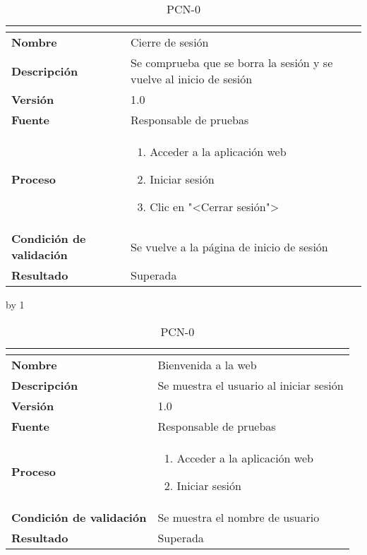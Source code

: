 \begin{table}[H]
	\caption{PCN-0\number\pcn}
	\begin{tabular}{|l|p{}|}
		\hline
		\multicolumn{2}{|c|}{\cellcolor[HTML]{BFBFBF}{\color[HTML]{000000} \textbf{PCN-0\number\pcn}}} \\ \hline
		\textbf{Nombre}                  & Cierre de sesión                                                    \\ \hline
		\textbf{Descripción}             & Se comprueba que se borra la sesión y se vuelve al inicio de sesión \\ \hline
		\textbf{Versión}                 & 1.0                                                                 \\ \hline
		\textbf{Fuente}                  & Responsable de pruebas                                              \\ \hline
		\textbf{Proceso}                 & \begin{enumerate}
			\item Acceder a la aplicación web
			\item Iniciar sesión
			\item Clic en "<Cerrar sesión">
		\end{enumerate}                                          \\ \hline
		\textbf{Condición de validación} & Se vuelve a la página de inicio de sesión                           \\ \hline
		\textbf{Resultado}               & Superada                                                            \\ \hline
	\end{tabular}
\end{table}
\advance\pcn by 1
\begin{table}[H]
	\caption{PCN-0\number\pcn}
	\begin{tabular}{|l|p{}|}
		\hline
		\multicolumn{2}{|c|}{\cellcolor[HTML]{BFBFBF}{\color[HTML]{000000} \textbf{PCN-0\number\pcn}}} \\ \hline
		\textbf{Nombre}                  & Bienvenida a la web                     \\ \hline
		\textbf{Descripción}             & Se muestra el usuario al iniciar sesión \\ \hline
		\textbf{Versión}                 & 1.0                                     \\ \hline
		\textbf{Fuente}                  & Responsable de pruebas                  \\ \hline
		\textbf{Proceso}                 & \begin{enumerate}
			\item Acceder a la aplicación web
			\item Iniciar sesión
		\end{enumerate}              \\ \hline
		\textbf{Condición de validación} & Se muestra el nombre de usuario         \\ \hline
		\textbf{Resultado}               & Superada                                \\ \hline
	\end{tabular}
\end{table}
